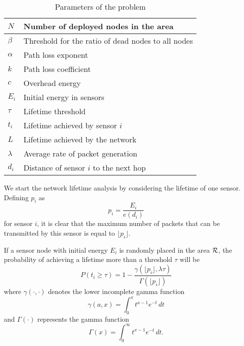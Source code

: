 \documentclass[conference]{IEEEtran}
\begin{document}
\begin{table}[!h]
\begin{center}
\begin{tabular}{|l l|}
\hline

$N$& Number of deployed nodes in the area\\
\hline

$\beta$& Threshold for the ratio of dead nodes to all nodes\\
\hline

$\alpha$& Path loss exponent\\
\hline

$k$& Path loss coefficient\\
\hline

$c$& Overhead energy\\
\hline

$E_i$& Initial energy in sensors\\
\hline

$\tau$ & Lifetime threshold\\
\hline

$t_i$& Lifetime achieved by sensor $i$\\
\hline

$L$& Lifetime achieved by the network\\
\hline

$\lambda$& Average rate of packet generation\\
\hline
$d_i$& Distance of sensor $i$ to the next hop\\
\hline
\end{tabular}
\caption{Parameters of the problem} \label{Parameters}
\end{center}
\end{table}
We start the network lifetime analysis by considering the lifetime
of one sensor. Defining $p_i$ as
\begin{equation}\label{Pi related to E}
p_i = \frac{E_i}{e(d_i)}
\end{equation}
for sensor $i$, it is clear that the maximum number of packets that
can be transmitted by this sensor is equal to $\lfloor p_i \rfloor$.

\lem \label{Lemma Sensor lifetime} If a sensor node with initial
energy $E_i$ is randomly placed in the area $\cal{R}$, the
probability of achieving a lifetime more than a threshold $\tau$
will be
\begin{equation}\label{ccdf of sensor lifetime}
P(t_i \geq \tau) = 1 - \frac{\gamma (\lfloor p_i \rfloor,\lambda
\tau)}{\Gamma(\lfloor p_i \rfloor)}
\end{equation}
where $\gamma( \cdot,\cdot)$ denotes the lower incomplete gamma
function
\begin{equation} \label{Lower Inc Gamma}
\gamma(a,x) = \int_0^x t^{a - 1} e^{-t}\,dt
\end{equation}
and $\Gamma(\cdot)$ represents the gamma function
\begin{equation}
\Gamma(x) = \int_0^{\infty} t^{x - 1} e^{-t}\,dt.
\end{equation}
\end{document}
